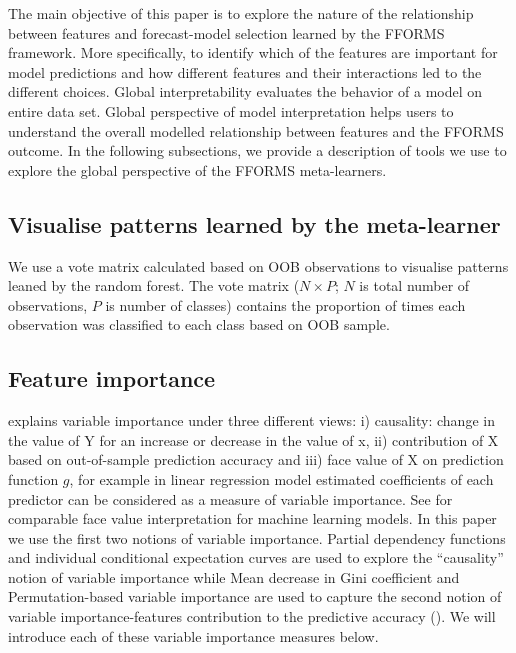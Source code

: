 \documentclass[11pt,a4paper,]{article}
\begin{document}
The main objective of this paper is to explore the nature of the
relationship between features and forecast-model selection learned by
the FFORMS framework. More specifically, to identify which of the
features are important for model predictions and how different features
and their interactions led to the different choices. Global
interpretability evaluates the behavior of a model on entire data set.
Global perspective of model interpretation helps users to understand the
overall modelled relationship between features and the FFORMS outcome.
In the following subsections, we provide a description of tools we use
to explore the global perspective of the FFORMS meta-learners.

\subsection{Visualise patterns learned by the
meta-learner}\label{visualise-patterns-learned-by-the-meta-learner}

We use a vote matrix calculated based on OOB observations to visualise
patterns leaned by the random forest. The vote matrix (\(N \times P\);
\(N\) is total number of observations, \(P\) is number of classes)
contains the proportion of times each observation was classified to each
class based on OOB sample.

\subsection{Feature importance}\label{feature-importance}

\textcite{jiang2002} explains variable importance under three different
views: i) causality: change in the value of Y for an increase or
decrease in the value of x, ii) contribution of X based on out-of-sample
prediction accuracy and iii) face value of X on prediction function
\(g\), for example in linear regression model estimated coefficients of
each predictor can be considered as a measure of variable importance.
See \textcite{jiang2002} for comparable face value interpretation for
machine learning models. In this paper we use the first two notions of
variable importance. Partial dependency functions and individual
conditional expectation curves are used to explore the ``causality''
notion of variable importance while Mean decrease in Gini coefficient
and Permutation-based variable importance are used to capture the second
notion of variable importance-features contribution to the predictive
accuracy (\textcite{Zhao}). We will introduce each of these variable
importance measures below.
\end{document}
